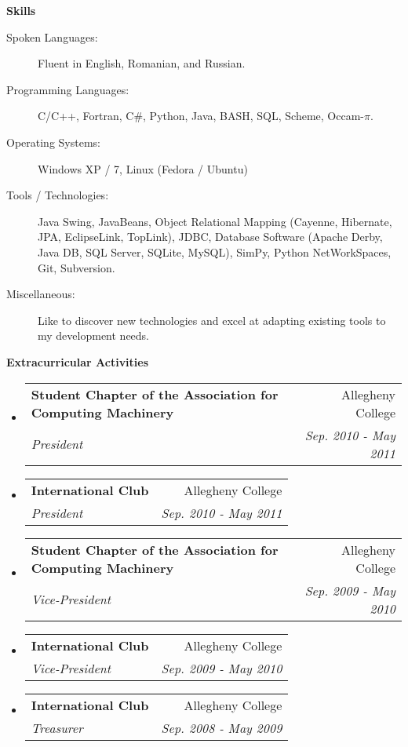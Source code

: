 \documentclass[letterpaper,11pt]{article}
\makeatletter
\newcommand{\resheading}[1]{{\large \colorbox{mygrey}{\begin{minipage}{\textwidth}{\textbf{#1 \vphantom{p\^{E}}}}\end{minipage}}}}
\newcommand{\ressubheading}[4]{
\begin{tabular*}{7.0in}{l@{\extracolsep{\fill}}r}
		\textbf{#1} & #2 \\
		\textit{#3} & \textit{#4} \\
\end{tabular*}\vspace{-6pt}}
\makeatother
\begin{document}
\pagebreak

\resheading{Skills}

\begin{description}
\item[Spoken Languages:]
Fluent in English, Romanian, and Russian.
\item[Programming Languages:]
C/C++, Fortran, C\#, Python, Java, BASH, SQL, Scheme, Occam-$\pi$.
\item[Operating Systems:]
Windows XP / 7, Linux (Fedora / Ubuntu)
\item[Tools / Technologies:]
Java Swing, JavaBeans, Object Relational Mapping (Cayenne, Hibernate, JPA, EclipseLink, TopLink), JDBC, Database Software (Apache Derby, Java DB, SQL Server, SQLite, MySQL), SimPy, Python NetWorkSpaces, Git, Subversion.
\item[Miscellaneous:]
Like to discover new technologies and excel at adapting existing tools to my development needs.
\end{description}

\resheading{Extracurricular Activities}
\begin{itemize}
\item
	\ressubheading{Student Chapter of the Association for Computing Machinery}{Allegheny College}{President}{Sep. 2010 - May 2011}
\item
	\ressubheading{International Club}{Allegheny College}{President}{Sep. 2010 - May 2011}
\item
	\ressubheading{Student Chapter of the Association for Computing Machinery}{Allegheny College}{Vice-President}{Sep. 2009 - May 2010}
\item
	\ressubheading{International Club}{Allegheny College}{Vice-President}{Sep. 2009 - May 2010}
\item
	\ressubheading{International Club}{Allegheny College}{Treasurer}{Sep. 2008 - May 2009}
\end{itemize}
\end{document}
